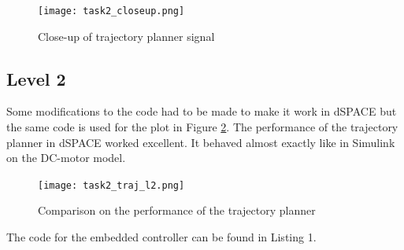 \begin{figure}[H]
	\begin{center}
	
		\texttt{[image: task2\_closeup.png]}
		\caption{Close-up of trajectory planner signal}
		\label{fig:task2_closeup}
	\end{center}
\end{figure}
\subsection*{Level 2}
Some modifications to the code had to be made to make it work in dSPACE
but the same code is used for the plot in Figure
\ref{fig:task2_traj_l2}. The performance of the trajectory planner in
dSPACE worked excellent. It behaved almost exactly like in Simulink on
the DC-motor model. 
\begin{figure}[H]
	\begin{center}
	
		\texttt{[image: task2\_traj\_l2.png]}
		\caption{Comparison on the performance of the trajectory planner}
		\label{fig:task2_traj_l2}
	\end{center}
\end{figure}
The code for the embedded controller can be found in Listing 1.

%

